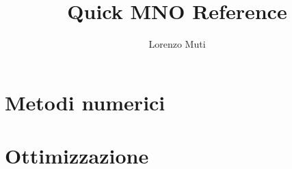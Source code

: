 \documentclass[8pt,a4paper]{book}
\begin{document}
\author{Lorenzo Muti}
\title{Quick MNO Reference}

\maketitle
\tableofcontents


\part{Metodi numerici}





\part{Ottimizzazione}


\end{document}
